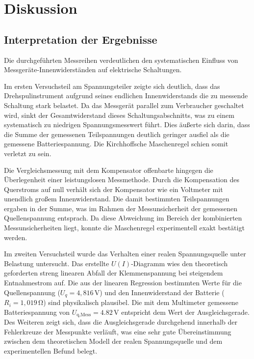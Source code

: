 \documentclass[12pt,a4paper,titlepage]{scrartcl}
\numberwithin{equation}{section}
\numberwithin{table}{section}
\numberwithin{figure}{section}
\begin{document}
\section{Diskussion}
\subsection{Interpretation der Ergebnisse}

Die durchgeführten Messreihen verdeutlichen den systematischen Einfluss von Messgeräte-Innenwiderständen auf elektrische Schaltungen. 

Im ersten Versuchsteil am Spannungsteiler zeigte sich deutlich, dass das Drehspulinstrument aufgrund seines endlichen Innenwiderstands die zu messende Schaltung stark belastet. 
Da das Messgerät parallel zum Verbraucher geschaltet wird, sinkt der Gesamtwiderstand dieses Schaltungsabschnitts, was zu einem systematisch zu niedrigen Spannungsmesswert führt.
Dies äußerte sich darin, dass die Summe der gemessenen Teilspannungen deutlich geringer ausfiel als die gemessene Batteriespannung. Die Kirchhoffsche Maschenregel schien somit verletzt zu sein. 

Die Vergleichsmessung mit dem Kompensator offenbarte hingegen die Überlegenheit einer leistungslosen Messmethode. Durch die Kompensation des Querstroms auf null verhält sich der 
Kompensator wie ein Voltmeter mit unendlich großem Innenwiderstand. Die damit bestimmten Teilspannungen ergaben in der Summe, was im Rahmen der Messunsicherheit der gemessenen Quellenspannung entsprach. 
Da diese Abweichung im Bereich der kombinierten Messunsicherheiten liegt,
konnte die Maschenregel experimentell exakt bestätigt werden.

Im zweiten Versuchsteil wurde das Verhalten einer realen Spannungsquelle unter Belastung untersucht. Das erstellte $U(I)$-Diagramm wies den theoretisch
geforderten streng linearen Abfall der Klemmenspannung bei steigendem Entnahmestrom auf. Die aus der linearen Regression bestimmten Werte für die Quellenspannung
($U_q = 4{,}816\,\text{V}$) und den Innenwiderstand der Batterie ($R_i = 1{,}019\,\si{\ohm}$) sind physikalisch plausibel. Die mit dem Multimeter gemessene Batteriespannung von $U_\text{q{,}Mess} = 4.82\,\text{V}$ entspricht dem Wert der Ausgleichsgerade. 
Des Weiteren zeigt sich, dass die Ausgleichsgerade durchgehend innerhalb der Fehlerkreuze der Messpunkte verläuft, was eine sehr gute Übereinstimmung zwischen dem theoretischen Modell der realen Spannungsquelle und dem experimentellen Befund belegt.
\end{document}
